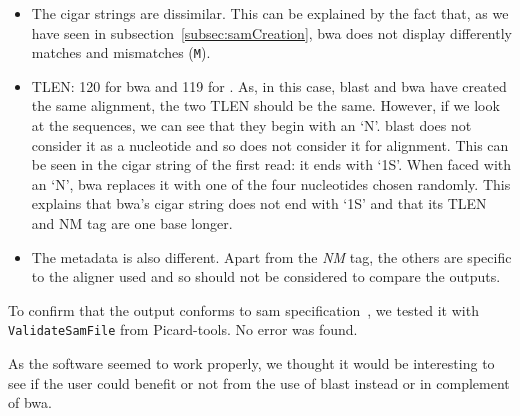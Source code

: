\begin{itemize}
    \item The \gls{cigar} strings are dissimilar.
    This can be explained by the fact that, as we have seen in subsection~\ref{subsec:samCreation}, \gls{bwa} does not display differently matches and mismatches (\texttt{M}).
    \item TLEN: 120 for \gls{bwa} and 119 for \blastobam{}. As, in this case, \gls{blast} and \gls{bwa} have created the same alignment, the two TLEN should be the same.
    However, if we look at the sequences, we can see that they begin with an `N'. \gls{blast} does not consider it as a nucleotide and so does not consider it for alignment.
    This can be seen in the \gls{cigar} string of the first read: it ends with `1S'. When faced with an `N', \gls{bwa} replaces it with one of the four nucleotides chosen randomly.
    This explains that \gls{bwa}'s \gls{cigar} string does not end with `1S' and that its TLEN and NM tag are one base longer.
    \item The metadata is also different. Apart from the \emph{NM} tag, the others are specific to the aligner used and so should not be considered to compare the outputs.
\end{itemize}

To confirm that the output conforms to \gls{sam} specification~\cite{samspec}, we tested it with \texttt{ValidateSamFile} from Picard-tools. No error was found. 

As the software seemed to work properly, we thought it would be interesting to see if the user could benefit or not from the use of \gls{blast} instead or in complement of \gls{bwa}. 

